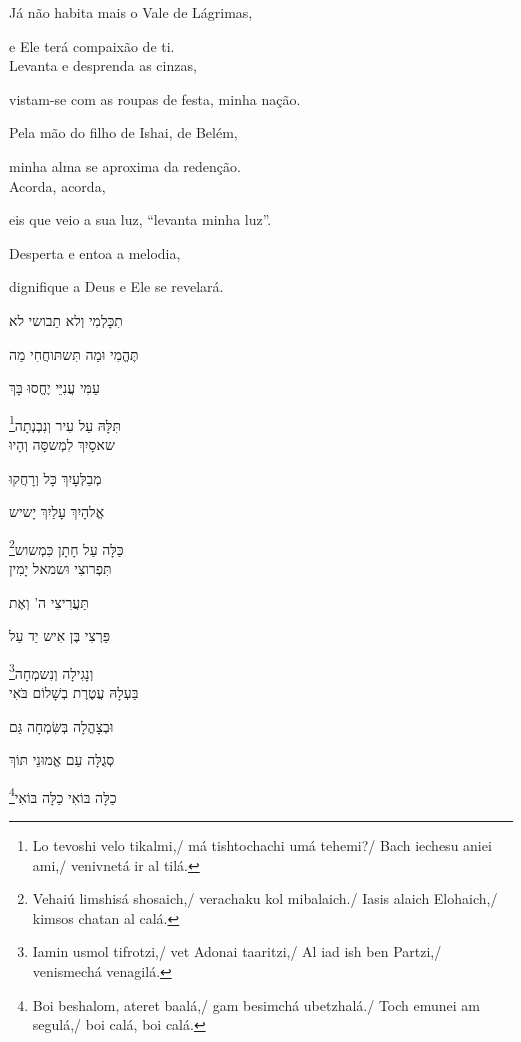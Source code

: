 Já não habita mais o Vale de Lágrimas,

e Ele terá compaixão de ti.\\[10pt]

Levanta e desprenda as cinzas,

vistam-se com as roupas de festa, minha nação.

Pela mão do filho de Ishai, de Belém,

minha alma se aproxima da redenção.\\[10pt]


Acorda, acorda,

eis que veio a sua luz, ``levanta minha luz''.

Desperta e entoa a melodia,

dignifique a Deus e Ele se revelará.\\[10pt]


\movetoevenpage
\raggedleft %

\vspace*{1cm}

תִכָּלְמִי וְלא תֵבושי לא 

תֶּהֱמִי וּמַה תִּשתּוחֲחִי מַה

עַמִּי עֲנִיֵּי יֶחֱסוּ בָּךְ

\footnote{Lo tevoshi velo tikalmi,/ má tishtochachi umá tehemi?/ Bach iechesu aniei ami,/ venivnetá ir al tilá.}תִּלָּהּ עַל עִיר וְנִבְנְתָה\\[10pt]

שאסָיִךְ לִמְשסָּה וְהָיוּ

מְבַלְּעָיִךְ כָּל וְרָחֲקוּ

אֱלהָיִךְ עָלַיִךְ יָשיש

\footnote{Vehaiú limshisá shosaich,/ verachaku kol mibalaich./ Iasis alaich Elohaich,/ kimsos chatan al calá.}כַּלָּה עַל חָתָן כִּמְשוש\\[10pt]

תִּפְרוצִי וּשמאל יָמִין

תַּעֲרִיצִי ה' וְאֶת

פַּרְצִי בֶּן אִיש יַד עַל 

\footnote{Iamin usmol tifrotzi,/ vet Adonai taaritzi,/ Al iad ish ben Partzi,/ venismechá venagilá.}וְנָגִילָה וְנִשמְחָה\\[10pt]


בַּעְלָהּ עֲטֶרֶת בְשָׁלוֹם בֹּאִי

וּבְצָהֳלָה בְּשִּׂמְחָה גַּם 

סְגֻלָּה עַם אֱמוּנֵי תּוֹךְ 

\footnote{Boi beshalom, ateret baalá,/ gam besimchá ubetzhalá./ Toch emunei am segulá,/ boi calá, boi calá.}כַלָּה בּוֹאִי כַלָּה בּוֹאִי

